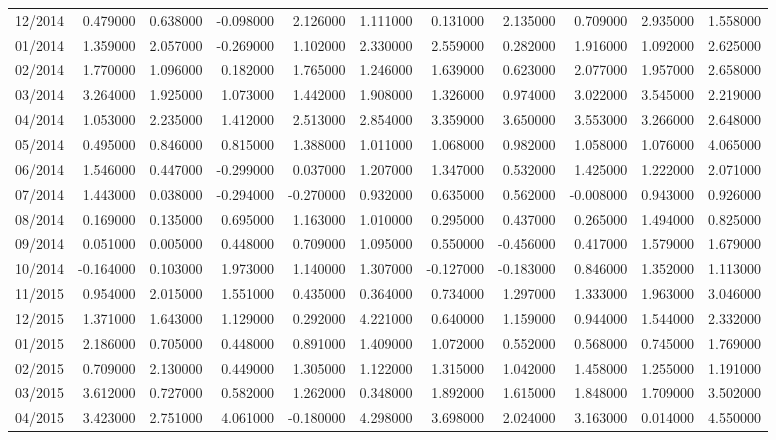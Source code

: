 \begin{tabular}{lrrrrrrrrrr}
12/2014 & 0.479000 & 0.638000 & -0.098000 & 2.126000 & 1.111000 & 0.131000 & 2.135000 & 0.709000 & 2.935000 & 1.558000 \\
01/2014 & 1.359000 & 2.057000 & -0.269000 & 1.102000 & 2.330000 & 2.559000 & 0.282000 & 1.916000 & 1.092000 & 2.625000 \\
02/2014 & 1.770000 & 1.096000 & 0.182000 & 1.765000 & 1.246000 & 1.639000 & 0.623000 & 2.077000 & 1.957000 & 2.658000 \\
03/2014 & 3.264000 & 1.925000 & 1.073000 & 1.442000 & 1.908000 & 1.326000 & 0.974000 & 3.022000 & 3.545000 & 2.219000 \\
04/2014 & 1.053000 & 2.235000 & 1.412000 & 2.513000 & 2.854000 & 3.359000 & 3.650000 & 3.553000 & 3.266000 & 2.648000 \\
05/2014 & 0.495000 & 0.846000 & 0.815000 & 1.388000 & 1.011000 & 1.068000 & 0.982000 & 1.058000 & 1.076000 & 4.065000 \\
06/2014 & 1.546000 & 0.447000 & -0.299000 & 0.037000 & 1.207000 & 1.347000 & 0.532000 & 1.425000 & 1.222000 & 2.071000 \\
07/2014 & 1.443000 & 0.038000 & -0.294000 & -0.270000 & 0.932000 & 0.635000 & 0.562000 & -0.008000 & 0.943000 & 0.926000 \\
08/2014 & 0.169000 & 0.135000 & 0.695000 & 1.163000 & 1.010000 & 0.295000 & 0.437000 & 0.265000 & 1.494000 & 0.825000 \\
09/2014 & 0.051000 & 0.005000 & 0.448000 & 0.709000 & 1.095000 & 0.550000 & -0.456000 & 0.417000 & 1.579000 & 1.679000 \\
10/2014 & -0.164000 & 0.103000 & 1.973000 & 1.140000 & 1.307000 & -0.127000 & -0.183000 & 0.846000 & 1.352000 & 1.113000 \\
11/2015 & 0.954000 & 2.015000 & 1.551000 & 0.435000 & 0.364000 & 0.734000 & 1.297000 & 1.333000 & 1.963000 & 3.046000 \\
12/2015 & 1.371000 & 1.643000 & 1.129000 & 0.292000 & 4.221000 & 0.640000 & 1.159000 & 0.944000 & 1.544000 & 2.332000 \\
01/2015 & 2.186000 & 0.705000 & 0.448000 & 0.891000 & 1.409000 & 1.072000 & 0.552000 & 0.568000 & 0.745000 & 1.769000 \\
02/2015 & 0.709000 & 2.130000 & 0.449000 & 1.305000 & 1.122000 & 1.315000 & 1.042000 & 1.458000 & 1.255000 & 1.191000 \\
03/2015 & 3.612000 & 0.727000 & 0.582000 & 1.262000 & 0.348000 & 1.892000 & 1.615000 & 1.848000 & 1.709000 & 3.502000 \\
04/2015 & 3.423000 & 2.751000 & 4.061000 & -0.180000 & 4.298000 & 3.698000 & 2.024000 & 3.163000 & 0.014000 & 4.550000 \\

\end{tabular}

